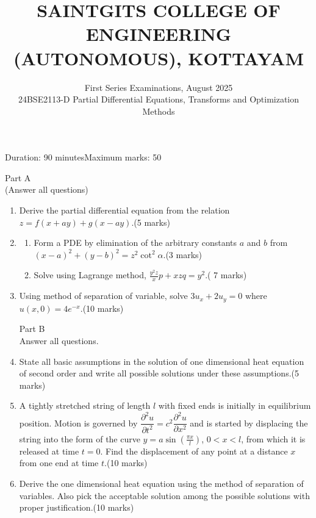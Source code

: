 \documentclass[]{article}
\title{\Large SAINTGITS COLLEGE OF ENGINEERING (AUTONOMOUS), KOTTAYAM}
\author{First Series Examinations, August 2025\\ 24BSE2113-D Partial Differential Equations, Transforms and Optimization Methods}
\date{}
\begin{document}
\maketitle
Duration: 90 minutes\hfill Maximum marks: 50
\begin{center}
	Part A\\
	(Answer all questions)
\end{center}
\begin{enumerate}
	\item Derive the partial differential equation from the relation $z=f(x+ay)+g(x-ay).$\hfill (5 marks)
	\item 
	\begin{enumerate}
		\item  Form a PDE by elimination of the arbitrary constants $a$ and $b$ from $(x-a)^2+(y-b)^2=z^2\cot^2 \alpha$.\hfill(3 marks)
		\item Solve using Lagrange method, $\frac{y^2z}{x}p+xzq=y^2$.\hfill( 7 marks)
	\end{enumerate}
	\item Using method of separation of variable, solve $\displaystyle 3u_x+2u_y=0$ where $u(x,0)=4e^{-x}$.\hfill(10 marks)
	\begin{center}
		Part B\\
		Answer all questions.
	\end{center}
\item State all basic assumptions in the solution of one dimensional heat equation of second order and write all possible solutions under these assumptions.\hfill(5 marks)
\item A tightly stretched string of length $l$ with fixed ends is initially in equilibrium position. Motion is governed by $\displaystyle \dfrac{\partial^2 u}{\partial t^2}=c^2\dfrac{\partial^2 u}{\partial x^2}$ and is started by displacing the string into the form of the curve $y=a\sin\left(\frac{\pi x}{l}\right)$, $0<x<l$, from which it is released at time $t=0$. Find the displacement of any point at a distance $x$ from one end at time $t$.\hfill(10 marks)
\item Derive the one dimensional heat equation using the method of separation of variables. Also pick the acceptable solution among the possible solutions with proper justification.\hfill(10 marks)
\end{enumerate}
\end{document}
